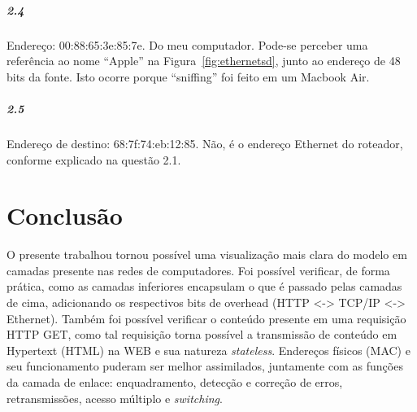 \documentclass[12pt,a4paper]{report}
\begin{document}
\paragraph{2.4} Endereço: 00:88:65:3e:85:7e. Do meu computador. Pode-se perceber uma referência ao nome ``Apple'' na Figura~\ref{fig:ethernetsd}, junto ao endereço de 48 bits da fonte. Isto ocorre porque ``sniffing'' foi feito em um Macbook Air.

\paragraph{2.5} Endereço de destino: 68:7f:74:eb:12:85. Não, é o endereço Ethernet do roteador, conforme explicado na questão 2.1.

\chapter{Conclusão} O presente trabalhou tornou possível uma visualização mais clara do modelo em camadas presente nas redes de computadores. Foi possível verificar, de forma prática, como as camadas inferiores encapsulam o que é passado pelas camadas de cima, adicionando os respectivos bits de overhead (HTTP <-> TCP/IP <-> Ethernet). Também foi possível verificar o conteúdo presente em uma requisição HTTP GET, como tal requisição torna possível a transmissão de conteúdo em Hypertext (HTML) na WEB e sua natureza \textit{stateless}. Endereços físicos (MAC) e seu funcionamento puderam ser melhor assimilados, juntamente com as funções da camada de enlace: enquadramento, detecção e correção de erros, retransmissões, acesso múltiplo e \textit{switching}.
\end{document}
